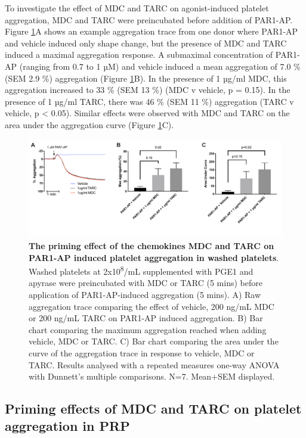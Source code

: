\documentclass[11pt,twoside]{bristolthesis}
\begin{document}
To investigate the effect of MDC and TARC on agonist-induced platelet aggregation, MDC and TARC were preincubated before addition of PAR1-AP. Figure \ref{fig:MDC-TARC-agg}A shows an example aggregation trace from one donor where PAR1-AP and vehicle induced only shape change, but the presence of MDC and TARC induced a maximal aggregation response. A submaximal concentration of PAR1-AP (ranging from 0.7 to 1 µM) and vehicle induced a mean aggregation of 7.0 \% (SEM 2.9 \%) aggregation (Figure \ref{fig:MDC-TARC-agg}B). In the presence of 1 µg/ml MDC, this aggregation increased to 33 \% (SEM 13 \%) (MDC v vehicle, p = 0.15). In the presence of 1 µg/ml TARC, there was 46 \% (SEM 11 \%) aggregation (TARC v vehicle, p \textless{} 0.05). Similar effects were observed with MDC and TARC on the area under the aggregation curve (Figure \ref{fig:MDC-TARC-agg}C).



\begin{figure}

{\centering \includegraphics[width=0.85\linewidth]{figure/Chemokines/Layouts/MDC_TARC_aggregation_PAR1} 

}

\caption[The priming effect of the chemokines MDC and TARC on PAR1-AP induced platelet aggregation in washed platelets]{\textbf{The priming effect of the chemokines MDC and TARC on PAR1-AP induced platelet aggregation in washed platelets}. Washed platelets at 2x10\textsuperscript{8}/mL supplemented with PGE1 and apyrase were preincubated with MDC or TARC (5 mins) before application of PAR1-AP-induced aggregation (5 mins). A) Raw aggregation trace comparing the effect of vehicle, 200 ng/mL MDC or 200 ng/mL TARC on PAR1-AP induced aggregation. B) Bar chart comparing the maximum aggregation reached when adding vehicle, MDC or TARC. C) Bar chart comparing the area under the curve of the aggregation trace in response to vehicle, MDC or TARC. Results analysed with a repeated measures one-way ANOVA with Dunnett's multiple comparisons. N=7. Mean+SEM displayed.}\label{fig:MDC-TARC-agg}
\end{figure}
\hypertarget{priming-effects-of-mdc-and-tarc-on-platelet-aggregation-in-prp}{%
\subsection{Priming effects of MDC and TARC on platelet aggregation in PRP}\label{priming-effects-of-mdc-and-tarc-on-platelet-aggregation-in-prp}}
\end{document}
